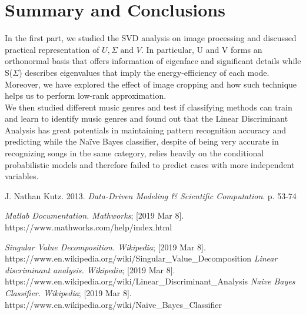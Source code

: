 \documentclass[11pt,a4paper]{article}
\numberwithin{equation}{subsection}
\begin{document}
\section{Summary and Conclusions}
In the first part, we studied the SVD analysis on image processing and discussed practical representation of $U, \Sigma \text{ and } V$. In particular, U and V forms an orthonormal basis that offers information of eigenface and significant details while S($\Sigma$) describes eigenvalues that imply the energy-efficiency of each mode. Moreover, we have explored the effect of image cropping and how such technique helps us to perform low-rank approximation.\\
We then studied different music genres and test if classifying methods can train and learn to identify music genres and found out that the Linear Discriminant Analysis has great potentials in maintaining pattern recognition accuracy and predicting while the Na\"ive Bayes classifier, despite of being very accurate in recognizing songs in the same category, relies heavily on the conditional probabilistic models and therefore failed to predict cases with more independent variables.


\begin{thebibliography}{3}
	J. Nathan Kutz. 2013.
	\textit{Data-Driven Modeling \& Scientific Computation}. p. 53-74
	
	\textit{Matlab Documentation. Mathworks}; [2019 Mar 8]. \\https://www.mathworks.com/help/index.html

	\textit{Singular Value Decomposition. Wikipedia}; [2019 Mar 8]. \\https://www.en.wikipedia.org/wiki/Singular\_Value\_Decomposition
	\textit{Linear discriminant analysis. Wikipedia}; [2019 Mar 8]. \\https://www.en.wikipedia.org/wiki/Linear\_Discriminant\_Analysis
	\textit{Naive Bayes Classifier. Wikipedia}; [2019 Mar 8]. \\https://www.en.wikipedia.org/wiki/Naive\_Bayes\_Classifier

\end{thebibliography}
\end{document}
